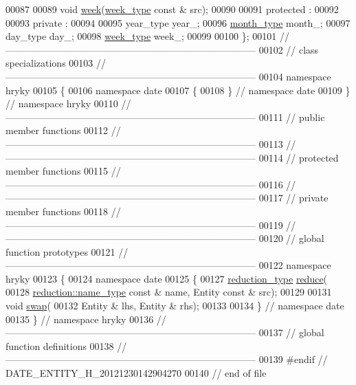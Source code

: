 \begin{DoxyCode}
00087 
00089     \textcolor{keywordtype}{void} \hyperlink{classhryky_1_1date_1_1_entity_ae2da29df451b2e3d9b145010c155bdae}{week}(\hyperlink{classhryky_1_1_kind}{week_type} \textcolor{keyword}{const} & src);
00090 
00091 \textcolor{keyword}{protected} :
00092 
00093 \textcolor{keyword}{private} :
00094 
00095     year\_type year\_;
00096     \hyperlink{classhryky_1_1_kind}{month_type} month\_;
00097     day\_type day\_;
00098     \hyperlink{classhryky_1_1_kind}{week_type} week\_;
00099 
00100 \};
00101 \textcolor{comment}{//
      ------------------------------------------------------------------------------}
00102 \textcolor{comment}{// class specializations}
00103 \textcolor{comment}{//
      ------------------------------------------------------------------------------}
00104 \textcolor{keyword}{namespace }hryky
00105 \{
00106 \textcolor{keyword}{namespace }date
00107 \{
00108 \} \textcolor{comment}{// namespace date}
00109 \} \textcolor{comment}{// namespace hryky}
00110 \textcolor{comment}{//
      ------------------------------------------------------------------------------}
00111 \textcolor{comment}{// public member functions}
00112 \textcolor{comment}{//
      ------------------------------------------------------------------------------}
00113 \textcolor{comment}{//
      ------------------------------------------------------------------------------}
00114 \textcolor{comment}{// protected member functions}
00115 \textcolor{comment}{//
      ------------------------------------------------------------------------------}
00116 \textcolor{comment}{//
      ------------------------------------------------------------------------------}
00117 \textcolor{comment}{// private member functions}
00118 \textcolor{comment}{//
      ------------------------------------------------------------------------------}
00119 \textcolor{comment}{//
      ------------------------------------------------------------------------------}
00120 \textcolor{comment}{// global function prototypes}
00121 \textcolor{comment}{//
      ------------------------------------------------------------------------------}
00122 \textcolor{keyword}{namespace }hryky
00123 \{
00124 \textcolor{keyword}{namespace }date
00125 \{
00127     \hyperlink{namespacehryky_a343a9a4c36a586be5c2693156200eadc}{reduction_type} \hyperlink{namespacehryky_af41cb3af6766761da0ff21b84527a52c}{reduce}(
00128         \hyperlink{namespacehryky_1_1reduction_ac686c30a4c8d196bbd0f05629a6b921f}{reduction::name_type} \textcolor{keyword}{const} & name, Entity \textcolor{keyword}{const} & src);
00129 
00131     \textcolor{keywordtype}{void} \hyperlink{namespacehryky_a4282146df5ea2b68cb667896a2205909}{swap}(
00132         Entity & lhs, Entity & rhs);
00133 
00134 \} \textcolor{comment}{// namespace date}
00135 \} \textcolor{comment}{// namespace hryky}
00136 \textcolor{comment}{//
      ------------------------------------------------------------------------------}
00137 \textcolor{comment}{// global function definitions}
00138 \textcolor{comment}{//
      ------------------------------------------------------------------------------}
00139 \textcolor{preprocessor}{#endif // DATE\_ENTITY\_H\_20121230142904270}
00140 \textcolor{preprocessor}{}\textcolor{comment}{// end of file}
\end{DoxyCode}
